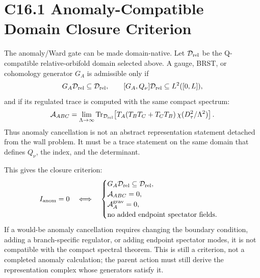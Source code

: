 \documentclass[11pt]{article}
\begin{document}
\section{C16.1 Anomaly-Compatible Domain Closure Criterion}
The anomaly/Ward gate can be made domain-native.  Let $\mathcal D_{\rm rel}$ be
the Q-compatible relative-orbifold domain selected above.  A gauge, BRST, or
cohomology generator $G_A$ is admissible only if
\begin{equation}
G_A\mathcal D_{\rm rel}\subseteq\mathcal D_{\rm rel},
\qquad
[G_A,Q_\nu]\mathcal D_{\rm rel}\subseteq L^2([0,L]),
\end{equation}
and if its regulated trace is computed with the same compact spectrum:
\begin{equation}
{\cal A}_{ABC}
=
\lim_{\Lambda\to\infty}
\operatorname{Tr}_{\mathcal D_{\rm rel}}
\!\left[
T_A(T_BT_C+T_CT_B)\,
\chi(D_\tau^2/\Lambda^2)
\right].
\end{equation}
Thus anomaly cancellation is not an abstract representation statement detached
from the wall problem.  It must be a trace statement on the same domain that
defines $Q_\nu$, the index, and the determinant.

This gives the closure criterion:
\begin{equation}
I_{\rm anom}=0
\quad\Longleftrightarrow\quad
\begin{cases}
G_A\mathcal D_{\rm rel}\subseteq\mathcal D_{\rm rel},\\
{\cal A}_{ABC}=0,\\
{\cal A}_A^{\rm grav}=0,\\
\hbox{no added endpoint spectator fields.}
\end{cases}
\end{equation}
If a would-be anomaly cancellation requires changing the boundary condition,
adding a branch-specific regulator, or adding endpoint spectator modes, it is
not compatible with the compact spectral theorem.  This is still a criterion,
not a completed anomaly calculation; the parent action must still derive the
representation complex whose generators satisfy it.
\end{document}
